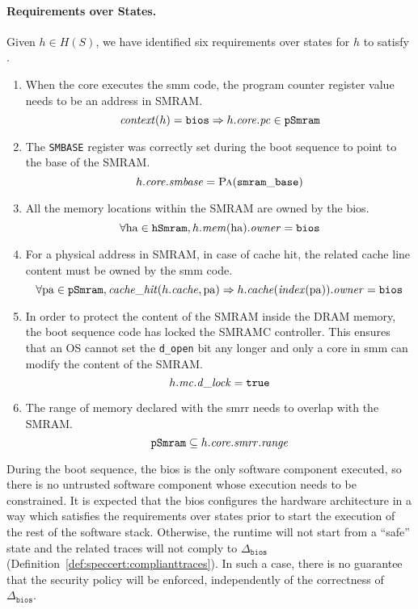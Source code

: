 \paragraph{Requirements over States.}
%
Given \( h \in H(S) \), we have identified six requirements over states for
\( h \) to satisfy .
%
\begin{enumerate}
\item When the core executes the \ac{smm} code, the program counter register
  value needs to be an address in SMRAM.
  \[
    \mathit{context}(h) = \mathtt{bios} \Rightarrow h.\mathit{core}.\mathit{pc} \in
    \texttt{pSmram}
  \]
\item The \texttt{SMBASE} register was correctly set during the boot sequence to
  point to the base of the SMRAM.
  \[
    h.\mathit{core}.\mathit{smbase} = \textsc{Pa}(\mathtt{smram\_base})
  \]
\item All the memory locations within the SMRAM are owned by the \ac{bios}.
  \[
    \forall \mathrm{ha} \in \texttt{hSmram}, h.\mathit{mem}(\mathrm{ha}).\mathit{owner} =
    \mathtt{bios}
  \]
\item For a physical address in SMRAM, in case of cache hit, the related cache
  line content must be owned by the \ac{smm} code.
  \[
    \forall \mathrm{pa} \in \texttt{pSmram}, \mathit{cache\_hit}(h.\mathit{cache},
    \mathrm{pa}) \Rightarrow h.\mathit{cache}(\mathit{index}(\mathrm{pa})).\mathit{owner} =
    \mathtt{bios}
  \]
\item In order to protect the content of the SMRAM inside the DRAM memory, the
  boot sequence code has locked the SMRAMC controller.
  This ensures that an OS cannot set the \texttt{d\_open} bit any longer and
  only a core in \ac{smm} can modify the content of the SMRAM.
  \[
    h.\mathit{mc}.\mathit{d\_lock} = \mathtt{true}
  \]
\item The range of memory declared with the \ac{smrr} needs to overlap with the
  SMRAM.
  \[
    \texttt{pSmram} \subseteq h.\mathit{core}.\mathit{smrr}.\mathit{range}
  \]
\end{enumerate}

During the boot sequence, the \ac{bios} is the only software component executed,
so there is no untrusted software component whose execution needs to be
constrained.
%
It is expected that the \ac{bios} configures the hardware architecture in a way
which satisfies the requirements over states prior to start the execution of the
rest of the software stack.
%
Otherwise, the runtime will not start from a ``safe'' state and the related
traces will not comply to \( \Delta_{\mathtt{bios}} \)
(Definition~\ref{def:speccert:complianttraces}).
%
In such a case, there is no guarantee that the security policy will be enforced,
independently of the correctness of \( \Delta_{\mathtt{bios}} \).

